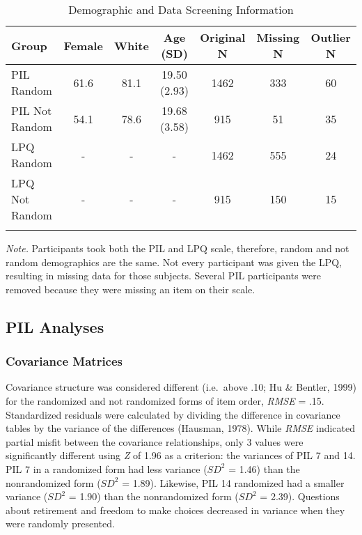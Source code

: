 \documentclass[english,man, mask]{apa6}
\theoremstyle{definition}
\theoremstyle{definition}
\theoremstyle{definition}
\theoremstyle{remark}
\begin{document}
\begin{table}[tbp]
\begin{center}
\begin{threeparttable}
\caption{\label{tab:demo-table}Demographic and Data Screening Information}
\begin{tabular}{lcccccc}
\toprule
Group & \multicolumn{1}{c}{Female} & \multicolumn{1}{c}{White} & \multicolumn{1}{c}{Age (SD)} & \multicolumn{1}{c}{Original N} & \multicolumn{1}{c}{Missing N} & \multicolumn{1}{c}{Outlier N}\\
\midrule
PIL Random & 61.6 & 81.1 & 19.50 (2.93) & 1462 & 333 & 60\\
PIL Not Random & 54.1 & 78.6 & 19.68 (3.58) & 915 & 51 & 35\\
LPQ Random & - & - & - & 1462 & 555 & 24\\
LPQ Not Random & - & - & - & 915 & 150 & 15\\
\bottomrule
\addlinespace
\end{tabular}
\begin{tablenotes}[para]
\textit{Note.} Participants took both the PIL and LPQ scale, therefore, random and not random demographics are the same. Not every participant was given the LPQ, resulting in missing data for those subjects. Several PIL participants were removed because they were missing an item on their scale.
\end{tablenotes}
\end{threeparttable}
\end{center}
\end{table}

\subsection{PIL Analyses}\label{pil-analyses}

\subsubsection{Covariance Matrices}\label{covariance-matrices}

Covariance structure was considered different (i.e.~above .10; Hu \&
Bentler, 1999) for the randomized and not randomized forms of item
order, \emph{RMSE} = .15. Standardized residuals were calculated by
dividing the difference in covariance tables by the variance of the
differences (Hausman, 1978). While \emph{RMSE} indicated partial misfit
between the covariance relationships, only 3 values were significantly
different using \emph{Z} of 1.96 as a criterion: the variances of PIL 7
and 14. PIL 7 in a randomized form had less variance (\(SD^2\) = 1.46)
than the nonrandomized form (\(SD^2\) = 1.89). Likewise, PIL 14
randomized had a smaller variance (\(SD^2\) = 1.90) than the
nonrandomized form (\(SD^2\) = 2.39). Questions about retirement and
freedom to make choices decreased in variance when they were randomly
presented.
\end{document}
